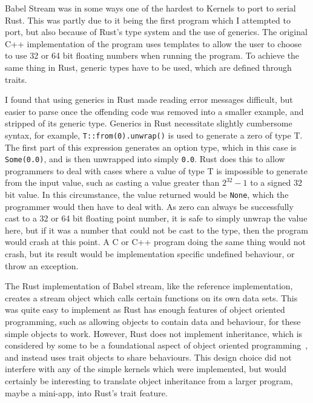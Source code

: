 Babel Stream was in some ways one of the hardest to Kernels to port to serial Rust. This was partly due to it being the first program which I attempted to port, but also because of Rust's type system and the use of generics. The original C++ implementation of the program uses templates to allow the user to choose to use 32 or 64 bit floating numbers when running the program. To achieve the same thing in Rust, generic types have to be used, which are defined through traits.

I found that using generics in Rust made reading error messages difficult, but easier to parse once the offending code was removed into a smaller example, and stripped of its generic type. Generics in Rust necessitate slightly cumbersome syntax, for example, \texttt{T::from(0).unwrap()} is used to generate a zero of type T. The first part of this expression generates an option type, which in this case is \texttt{Some(0.0)}, and is then unwrapped into simply \texttt{0.0}. Rust does this to allow programmers to deal with cases where a value of type T is impossible to generate from the input value, such as casting a value greater than $2^{32} - 1$ to a signed 32 bit value. In this circumstance, the value returned would be \texttt{None}, which the programmer would then have to deal with. As zero can always be successfully cast to a 32 or 64 bit floating point number, it is safe to simply unwrap the value here, but if it was a number that could not be cast to the type, then the program would crash at this point. A C or C++ program doing the same thing would not crash, but its result would be implementation specific undefined behaviour, or throw an exception. 

The Rust implementation of Babel stream, like the reference implementation, creates a stream object which calls certain functions on its own data sets. This was quite easy to implement as Rust has enough features of object oriented programming, such as allowing objects to contain data and behaviour, for these simple objects to work. However, Rust does not implement inheritance, which is considered by some to be a foundational aspect of object oriented programming~\cite{Liskov:1987}, and instead uses trait objects to share behaviours. This design choice did not interfere with any of the simple kernels which were implemented, but would certainly be interesting to translate object inheritance from a larger program, maybe a mini-app, into Rust's trait feature.

